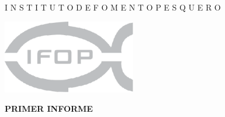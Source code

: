 \documentclass[12pt, oneside]{article} %
\renewcommand{\baselinestretch}{1.2}
\begin{document}
\begin{titlepage}

\renewcommand{\baselinestretch}{1.3}
\null
\large
\begin{center}
\fontsize{12pt}{8pt}\selectfont
{}\uppercase\expandafter{}  I \hspace{0.3pt} N  \hspace{0.3pt} S  \hspace{0.3pt}  T \hspace{0.3pt}   I \hspace{0.3pt}    T \hspace{0.3pt}    U   \hspace{0.3pt}  T  \hspace{0.3pt}  O \hspace{20pt} D  \hspace{0.3pt}  E \hspace{20pt}  F   \hspace{0.3pt} O  \hspace{0.3pt}  M \hspace{0.3pt}   E \hspace{0.3pt}   N  \hspace{0.3pt}  T \hspace{0.3pt}   O  \hspace{20pt}  P \hspace{0.3pt}   E  \hspace{0.3pt}  S \hspace{0.3pt}   Q   \hspace{0.3pt} U  \hspace{0.3pt}  E \hspace{0.3pt}   R  \hspace{0.3pt}  O 
\end{center}
\normalsize


 \hfill  \includegraphics[height=3.2cm]{Figuras/logoIFOPgris_Portada.pdf}

\vspace*{0.5cm} 

\centering \fontsize{14pt}{8pt}\selectfont
            \vspace*{1mm} 
            \hfill \textbf{PRIMER INFORME}
        

\end{titlepage}
\end{document}
